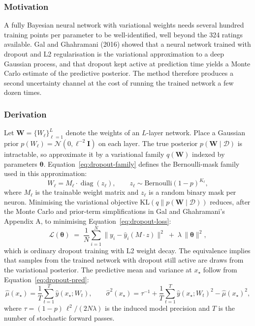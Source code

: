 \documentclass{article}
\begin{document}
\subsubsection*{Motivation}

A fully Bayesian neural network with variational weights needs several hundred training points per parameter to be well-identified, well beyond the 324 ratings available. Gal and Ghahramani (2016) showed that a neural network trained with dropout and L2 regularisation is the variational approximation to a deep Gaussian process, and that dropout kept active at prediction time yields a Monte Carlo estimate of the predictive posterior. The method therefore produces a second uncertainty channel at the cost of running the trained network a few dozen times.

\subsubsection*{Derivation}

Let $\mathbf{W} = \{W_\ell\}_{\ell=1}^L$ denote the weights of an $L$-layer network. Place a Gaussian prior $p(W_\ell) = \mathcal{N}(0, \ell^{-2} \mathbf{I})$ on each layer. The true posterior $p(\mathbf{W} \mid \mathcal{D})$ is intractable, so approximate it by a variational family $q(\mathbf{W})$ indexed by parameters $\boldsymbol\theta$. Equation~\ref{eq:dropout-family} defines the Bernoulli-mask family used in this approximation:
\begin{equation}
W_\ell = M_\ell \cdot \operatorname{diag}(z_\ell), \qquad z_\ell \sim \mathrm{Bernoulli}(1 - p)^{K_\ell},
\label{eq:dropout-family}
\end{equation}
where $M_\ell$ is the trainable weight matrix and $z_\ell$ is a random binary mask per neuron. Minimising the variational objective $\mathrm{KL}(q\| p(\mathbf{W} \mid \mathcal{D}))$ reduces, after the Monte Carlo and prior-term simplifications in Gal and Ghahramani's Appendix A, to minimising Equation~\ref{eq:dropout-loss}:
\begin{equation}
\mathcal{L}(\boldsymbol\theta) \;=\; \frac{1}{N}\sum_{i=1}^N \bigl\|y_i - \hat y_i(M \cdot z)\bigr\|^2 \;+\; \lambda\,\|\boldsymbol\theta\|^2,
\label{eq:dropout-loss}
\end{equation}
which is ordinary dropout training with L2 weight decay. The equivalence implies that samples from the trained network with dropout still active are draws from the variational posterior. The predictive mean and variance at $x_\star$ follow from Equation~\ref{eq:dropout-pred}:
\begin{equation}
\hat\mu(x_\star) = \frac{1}{T}\sum_{t=1}^T \hat y(x_\star; W_t), \qquad \hat\sigma^2(x_\star) = \tau^{-1} + \frac{1}{T}\sum_{t=1}^T \hat y(x_\star; W_t)^2 - \hat\mu(x_\star)^2,
\label{eq:dropout-pred}
\end{equation}
where $\tau = (1 - p)\,\ell^2 / (2 N \lambda)$ is the induced model precision and $T$ is the number of stochastic forward passes.
\end{document}
